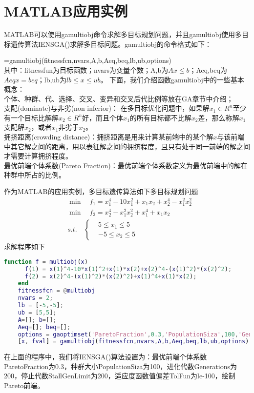 \section{MATLAB应用实例}
    \par
    MATLAB可以使用gamultiobj命令求解多目标规划问题，并且gamultiobj使用多目标遗传算法IENSGA()求解多目标问题。gamultiobj的命令格式如下：
    \par
    [x,fval]=gamultiobj(fitnessfcn,nvars,A,b,Aeq,beq,lb,ub,options)\\
    其中：fitnessfun为目标函数；nvars为变量个数；A,b为$Ax\leqslant b$；Aeq,beq为$Aeq {}x= beq$；lb,ub为$lb \leqslant x \leqslant ub$。
    下面，我们介绍函数gamultiobj中的一些基本概念：\\
    个体、种群、代、选择、交叉、变异和交叉后代比例等放在GA章节中介绍；\\
    支配(dominate)与非劣(non-inferior)：
    在多目标优化问题中，如果解$x_1 \in R^n$至少有一个目标比解解$x_2 \in R^n$好，而且个体$x_1$的所有目标都不比解$x_2$差，那么称解$x_1$支配解$x_2$，或者$x_1$非劣于$x_2$。\\
    拥挤距离(crowding distance)：拥挤距离是用来计算某前端中的某个解$x$与该前端中其它解之间的距离，用以表征解之间的拥挤程度，且只有处于同一前端的解之间才需要计算拥挤程度。\\
    最优前端个体系数(Pareto Fraction)：最优前端个体系数定义为最优前端中的解在种群中所占的比例。
    \par
    作为MATLAB的应用实例，多目标遗传算法如下多目标规划问题
    \begin{align*}
       & {\min}\quad f_1=x_1^4-10x_1^2+x_1x_2+x_2^4-x_1^2x_2^2\\
       & {\min}\quad f_2=x_2^4-x_1^2x_2^2+x_1^4+x_1x_2\\
       & s.t.\quad \left\{\begin{aligned}
       & 5 \leqslant x_1 \leqslant 5\\
       & -5 \leqslant x_2 \leqslant 5
       \end{aligned}
       \right.
    \end{align*}
    求解程序如下
    \begin{lstlisting}[language=Matlab]
    function f = multiobj(x)
      f(1) = x(1)^4-10*x(1)^2+x(1)*x(2)+x(2)^4-(x(1)^2)*(x(2)^2);
      f(2) = x(2)^4-(x(1)^2)*(x(2)^2)+x(1)^4+x(1)*x(2);
    end
    fitnessfcn = @multiobj
    nvars = 2;
    lb = [-5,-5];
    ub = [5,5];
    A=[]; b=[];
    Aeq=[]; beq=[];
    options = gaoptimset('ParetoFraction',0.3,'PopulationSiza',100,'Generations',200,'StallGenLimit',200,'TolFun',le-100,'PlotFcns',@gaplotpareto);
    [x, fval] = gamultiobj(fitnessfcn,nvars,A,b,Aeq,beq,lb,ub,options);
    \end{lstlisting}
    \par
    在上面的程序中，我们将IENSGA()算法设置为：最优前端个体系数ParetoFraction为0.3，种群大小PopulationSiza为100，进化代数Generations为200，停止代数StallGenLimit为200，适应度函数值偏差TolFun为le-100，绘制Pareto前端。
% 
